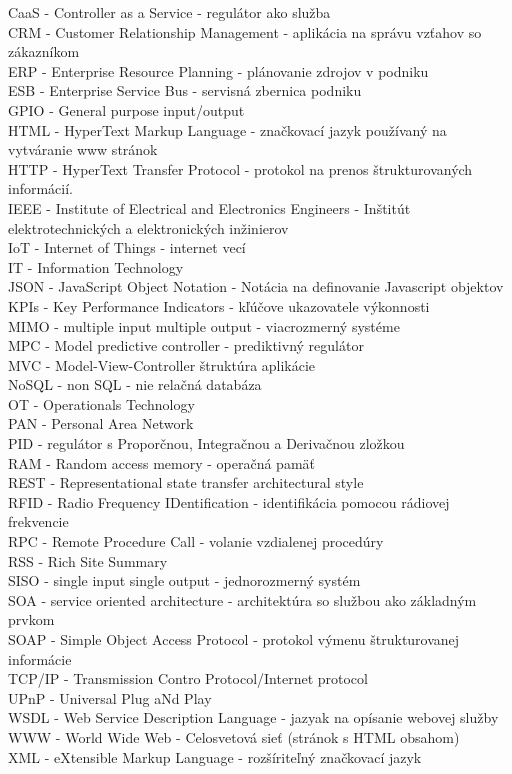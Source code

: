 CaaS - Controller as a Service - regulátor ako služba \\
CRM - Customer Relationship Management - aplikácia na správu vzťahov so zákazníkom \\
ERP - Enterprise Resource Planning - plánovanie zdrojov v podniku \\
ESB - Enterprise Service Bus - servisná zbernica podniku \\
GPIO - General purpose input/output \\
HTML - HyperText Markup Language - značkovací jazyk používaný na vytváranie www stránok \\
HTTP - HyperText Transfer Protocol - protokol na prenos štrukturovaných informácií. \\
IEEE - Institute of Electrical and Electronics Engineers - Inštitút elektrotechnických a elektronických inžinierov \\
IoT - Internet of Things - internet vecí \\
IT - Information Technology \\
JSON - JavaScript Object Notation - Notácia na definovanie Javascript objektov \\
KPIs - Key Performance Indicators - kľúčove ukazovatele výkonnosti \\
MIMO - multiple input multiple output - viacrozmerný systéme \\
MPC - Model predictive controller - prediktivný regulátor \\
MVC - Model-View-Controller štruktúra aplikácie \\
NoSQL - non SQL - nie relačná databáza \\
OT - Operationals Technology \\
PAN - Personal Area Network \\
PID - regulátor s Proporčnou, Integračnou a Derivačnou zložkou \\
RAM - Random access memory - operačná pamäť \\
REST - Representational state transfer architectural style \\
RFID - Radio Frequency IDentification - identifikácia pomocou rádiovej frekvencie \\
RPC - Remote Procedure Call - volanie vzdialenej procedúry \\
RSS - Rich Site Summary \\
SISO - single input single output - jednorozmerný systém \\
SOA - service oriented architecture - architektúra so službou ako základným prvkom \\
SOAP - Simple Object Access Protocol - protokol výmenu štrukturovanej informácie \\
TCP/IP - Transmission Contro Protocol/Internet protocol \\ 
UPnP - Universal Plug aNd Play \\
WSDL - Web Service Description Language - jazyak na opísanie webovej služby \\
WWW - World Wide Web - Celosvetová sieť (stránok s HTML obsahom) \\
XML - eXtensible Markup Language - rozšíriteľný značkovací jazyk
